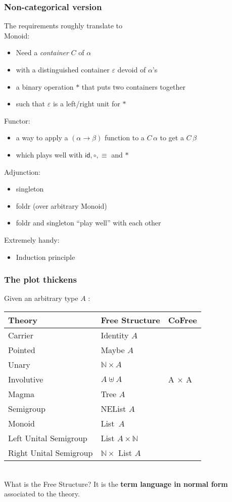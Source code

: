 \documentclass[serif,mathserif,professionalfont,10pt]{beamer}
\newcommand{\sred}[1]{\textcolor{slidered}{#1}}
\newcommand{\sblue}[1]{\textcolor{slideblue}{#1}}
\begin{document}
\begin{frame}
\frametitle{Non-categorical version}
The requirements roughly translate to\\
Monoid:
\begin{itemize}
\item Need a \emph{container} $C$ of $α$
\item with a distinguished container $ε$ devoid of $α$'s
\item a binary operation $*$ that puts two containers together
\item such that $ε$ is a left/right unit for $*$
\end{itemize}
Functor:
\begin{itemize}
\item a way to apply a $(α → β)$ function to a $C\, α$ to get a $C \, β$
\item which plays well with $\mathsf{id}, ∘, ≡$ and $*$
\end{itemize}
Adjunction:
\begin{itemize}
\item singleton
\item foldr (over arbitrary Monoid)
\item foldr and singleton ``play well'' with each other
\end{itemize}
Extremely handy:
\begin{itemize}
\item Induction principle
\end{itemize}
\end{frame}
%
%

\begin{frame}
\frametitle{The plot thickens}
Given an arbitrary type $A$ : \\ \vspace*{4mm}
\begin{tabular}{lll}
\textbf{Theory} & \textbf{Free Structure} & CoFree \\ \hline
Carrier & Identity $A$ & \\
Pointed & Maybe $A$ & \\ \hline
Unary & $ℕ × A$ &  \\
Involutive & $A ⊎ A$ & A × A \\ \hline
Magma & Tree $A$ &  \\
Semigroup & NEList $A$ & \\ \hline
Monoid & List\, $A$ & \\
Left Unital Semigroup & List $A × ℕ$ & \\
Right Unital Semigroup & $ℕ ×$ List $A$ & \\ \hline
\end{tabular}\\ \vspace*{4mm}
\pause
What is the \sblue{Free Structure}? It is the
\sred{\textbf{term language in normal form}} associated to the theory.\\
\end{frame}
\end{document}
